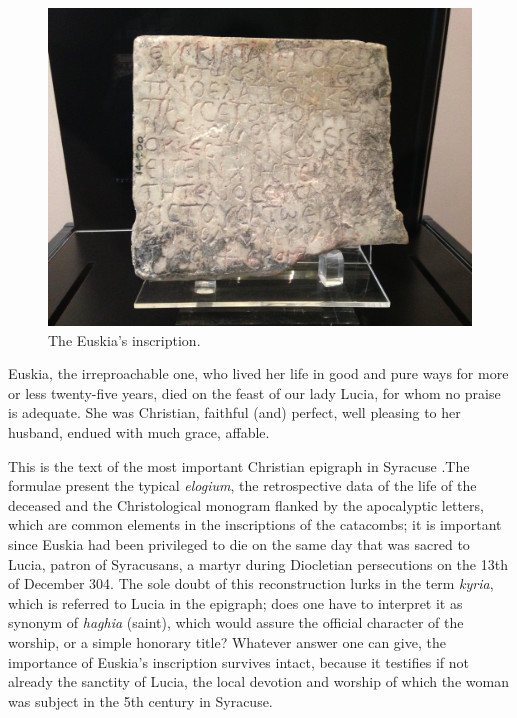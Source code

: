\documentclass[amsthm,ebook]{saparticle}
\begin{document}
\begin{figure}[hbp]
\centering
 \includegraphics[width=\columnwidth]{Euskia.JPG}
\caption{ The Euskia’s inscription.}
\label{fig:3}
\end{figure}

Euskia, the irreproachable one, who lived her life in good and pure ways for more or less twenty-five years, died on the feast of our lady Lucia, for whom no praise is adequate. She was Christian, faithful (and) perfect, well pleasing to her husband, endued with much grace, affable.

This is the text of the most important Christian epigraph in Syracuse \citep[20]{AGNELLO1953}.The formulae present the typical \emph{elogium}, the retrospective data of the life of the deceased and the Christological monogram flanked by the apocalyptic letters, which are common elements in the inscriptions of the catacombs; it is important since Euskia had been privileged to die on the same day that was sacred to Lucia, patron of Syracusans, a martyr during Diocletian persecutions on the 13th of December 304. The sole doubt of this reconstruction lurks in the term \emph{kyria}, which is referred to Lucia in the epigraph; does one have to interpret it as synonym of \emph{haghia} (saint), which would assure the official character of the worship, or a simple honorary title? Whatever answer one can give, the importance of Euskia’s inscription survives intact, because it testifies if not already the sanctity of Lucia, the local devotion and worship of which the woman was subject in the 5th century in Syracuse.
\end{document}
